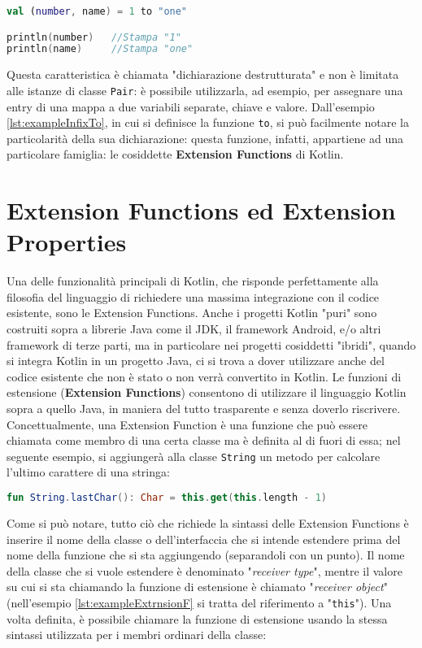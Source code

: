 \begin{lstlisting}[caption={Infix call e destructured declaration}, captionpos=b, label={lst:exampleDestructured}, language=Kotlin]
val (number, name) = 1 to "one"

println(number)   //Stampa "1"
println(name)     //Stampa "one"
\end{lstlisting}

Questa caratteristica è chiamata "dichiarazione destrutturata" e non è limitata alle istanze di classe \texttt{Pair}: è possibile utilizzarla, ad esempio, per assegnare una entry di una mappa a due variabili separate, chiave e valore. Dall'esempio \ref{lst:exampleInfixTo}, in cui si definisce la funzione \texttt{to}, si può facilmente notare la particolarità della sua dichiarazione: questa funzione, infatti, appartiene ad una particolare famiglia: le cosiddette {\bfseries Extension Functions} di Kotlin.\\

\section{Extension Functions ed Extension Properties}
Una delle funzionalità principali di Kotlin, che risponde perfettamente alla filosofia del linguaggio di richiedere una massima integrazione con il codice esistente, sono le Extension Functions. Anche i progetti Kotlin "puri" sono costruiti sopra a librerie Java come il JDK, il framework Android, e/o altri framework di terze parti, ma in particolare nei progetti cosiddetti "ibridi", quando si integra Kotlin in un progetto Java, ci si trova a dover utilizzare anche del codice esistente che non è stato o non verrà convertito in Kotlin. Le funzioni di estensione ({\bfseries Extension Functions}) consentono di utilizzare il linguaggio Kotlin sopra a quello Java, in maniera del tutto trasparente e senza doverlo riscrivere. Concettualmente, una Extension Function è una funzione che può essere chiamata come membro di una certa classe ma è definita al di fuori di essa; nel seguente esempio, si aggiungerà alla classe \texttt{String} un metodo per calcolare l’ultimo carattere di una stringa:\\
\begin{lstlisting}[caption={Definizione di una Extension Function}, captionpos=b, label={lst:exampleExtrnsionF}, language=Kotlin]
fun String.lastChar(): Char = this.get(this.length - 1)
\end{lstlisting}

Come si può notare, tutto ciò che richiede la sintassi delle Extension Functions è inserire il nome della classe o dell'interfaccia che si intende estendere prima del nome della funzione che si sta aggiungendo (separandoli con un punto). Il nome della classe che si vuole estendere è denominato "{\em receiver type}", mentre il valore su cui si sta chiamando la funzione di estensione è chiamato "{\em receiver object}" (nell'esempio \ref{lst:exampleExtrnsionF} si tratta del riferimento a "\texttt{this}"). Una volta definita, è possibile chiamare la funzione di estensione usando la stessa sintassi utilizzata per i membri ordinari della classe:\\

